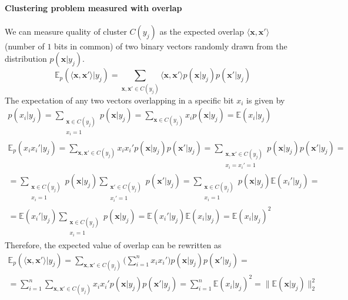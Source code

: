 \documentclass[12pt]{article}
\begin{document}
\paragraph{Clustering problem measured with overlap}
We can measure quality of cluster $C(y_j)$ as the expected overlap $\langle \boldsymbol{x}, \boldsymbol{x}'\rangle$ (number of $1$ bits in common) of two binary vectors  randomly drawn from the distribution $p(\boldsymbol{x}|y_j)$.
\[
\mathbb{E}_p(\langle \boldsymbol{x}, \boldsymbol{x}'\rangle|y_j) = \sum_{\boldsymbol{x},\boldsymbol{x}'\in C(y_j)} \langle \boldsymbol{x}, \boldsymbol{x}'\rangle p(\boldsymbol{x}|y_j)p(\boldsymbol{x}'|y_j)
\]
The expectation of any two vectors overlapping in a specific bit $x_i$ is given by
\begin{gather*}
p(x_i|y_j) = \sum_{\substack{\boldsymbol{x}\in C(y_j)\\x_i=1}} p(\boldsymbol{x}|y_j)	= \sum_{\boldsymbol{x}\in C(y_j)} x_i p(\boldsymbol{x}|y_j)	= \mathbb{E}(x_i|y_j)\\
\mathbb{E}_p(x_i x_i' | y_j) = \sum_{\boldsymbol{x},\boldsymbol{x}'\in C(y_j)}  x_i x_i' p(\boldsymbol{x}|y_j)p(\boldsymbol{x}'|y_j) = 	\sum_{\substack{\boldsymbol{x},\boldsymbol{x}'\in C(y_j) \\ x_i=x_i'=1}} p(\boldsymbol{x}|y_j)p(\boldsymbol{x}'|y_j) = \\
= \sum_{\substack{\boldsymbol{x}\in C(y_j) \\ x_i=1}} p(\boldsymbol{x}|y_j) \sum_{\substack{\boldsymbol{x}'\in C(y_j) \\ x_i'=1}} p(\boldsymbol{x}'|y_j) = 
\sum_{\substack{\boldsymbol{x}\in C(y_j) \\ x_i=1}} p(\boldsymbol{x}|y_j) \mathbb{E}(x_i'|y_j)= \\
= \mathbb{E}(x_i'|y_j) \sum_{\substack{\boldsymbol{x}\in C(y_j) \\ x_i=1}} p(\boldsymbol{x}|y_j) = \mathbb{E}(x_i'|y_j) \mathbb{E}(x_i|y_j) = \mathbb{E}(x_i|y_j)^2
\end{gather*}
Therefore, the expected value of overlap can be rewritten as  
\begin{gather*}
\mathbb{E}_p(\langle \boldsymbol{x}, \boldsymbol{x}'\rangle|y_j) =  \sum_{\boldsymbol{x},\boldsymbol{x}'\in C(y_j)} \big(\sum_{i=1}^n x_i x_i'\big)  p(\boldsymbol{x}|y_j)p(\boldsymbol{x}'|y_j) = \\
= \sum_{i=1}^n \sum_{\boldsymbol{x},\boldsymbol{x}'\in C(y_j)}  x_i x_i'  p(\boldsymbol{x}|y_j)p(\boldsymbol{x}'|y_j) = \sum_{i=1}^n \mathbb{E}(x_i|y_j)^2 = \lVert \mathbb{E}(\boldsymbol{x}|y_j) \rVert_2^2
\end{gather*}
\end{document}
